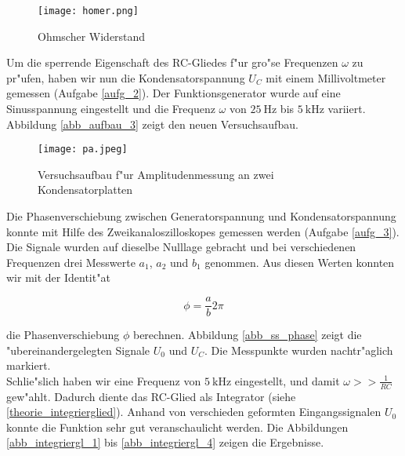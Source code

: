 \documentclass{scrartcl}
\begin{document}
			\begin{figure}[ht]
				\centering
				\texttt{[image: homer.png]}
					\caption {Ohmscher Widerstand}
			\end{figure}

			Um die sperrende Eigenschaft des RC-Gliedes f"ur gro"se Frequenzen $\omega$ zu pr"ufen, haben wir nun die Kondensatorspannung $U_C$ mit einem Millivoltmeter gemessen (Aufgabe \ref{aufg_2}).
			Der Funktions\-generator wurde auf eine Sinusspannung eingestellt und die Frequenz $\omega$ von $\SI{25}{\hertz}$ bis $\SI{5}{\kilo\hertz}$ variiert. Abbildung \ref{abb_aufbau_3} zeigt den neuen Versuchsaufbau. \\

			\begin{figure}[ht]
				\centering
				\texttt{[image: pa.jpeg]}
					\caption {Versuchsaufbau f"ur Amplitudenmessung an zwei Kondensatorplatten}
			\end{figure}

			Die Phasenverschiebung zwischen Generatorspannung und Kondensatorspannung konnte mit Hilfe des Zweikanaloszilloskopes gemessen werden (Aufgabe \ref{aufg_3}).
			Die Signale wurden auf dieselbe Nulllage gebracht und bei verschiedenen Frequenzen drei Messwerte $a_1$, $a_2$ und $b_1$ genommen.
			Aus diesen Werten konnten wir mit der Identit"at

			\begin{equation}
				\phi = \frac{a}{b} 2 \pi
			\end{equation}

			die Phasenverschiebung $\phi$ berechnen.
			Abbildung \ref{abb_ss_phase} zeigt die "ubereinandergelegten Signale $U_0$ und $U_C$. Die Messpunkte wurden nachtr"aglich markiert.\\

			Schlie"slich haben wir eine Frequenz von $\SI{5}{\kilo\hertz}$ eingestellt, und damit $\omega >> \frac{1}{RC}$ gew"ahlt.
			Dadurch diente das RC-Glied als Integrator (siehe \ref{theorie_integrierglied}).
			Anhand von verschieden geformten Eingangssignalen $U_0$ konnte die Funktion sehr gut veranschaulicht werden.
			Die Abbildungen \ref{abb_integriergl_1} bis \ref{abb_integriergl_4} zeigen die Ergebnisse.
\end{document}
